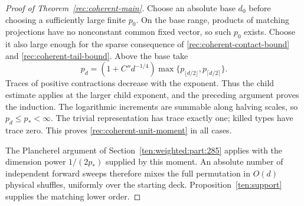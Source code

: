 \begin{proof}[Proof of Theorem~\ref{rec:coherent-main}]
Choose an absolute base $d_0$ before choosing a sufficiently large
finite $p_0$.  On the base range, products of matching projections
have no nonconstant common fixed vector, so such $p_0$ exists.
Choose it also large enough for the sparse consequence of
\eqref{rec:coherent-contact-bound} and
\eqref{rec:coherent-tail-bound}.
Above the base take
\[
 p_d=(1+C''d^{-1/4})
       \max\{p_{\lfloor d/2\rfloor},p_{\lceil d/2\rceil}\}.
\]
Traces of positive contractions decrease with the exponent.
Thus the child estimate applies at the larger child exponent, and
the preceding argument proves the induction.  The logarithmic
increments are summable along halving scales, so $p_d\le p_*<\infty$.
The trivial representation has trace exactly one; killed types have
trace zero.  This proves \eqref{rec:coherent-unit-moment} in all cases.

The Plancherel argument of Section~\ref{ten:weighted:part:285}
applies with the dimension power $1/(2p_*)$ supplied by this
moment.  An absolute number of independent forward sweeps therefore
mixes the full permutation in $O(d)$ physical shuffles, uniformly
over the starting deck.  Proposition~\ref{ten:support} supplies
the matching lower order.
\end{proof}
